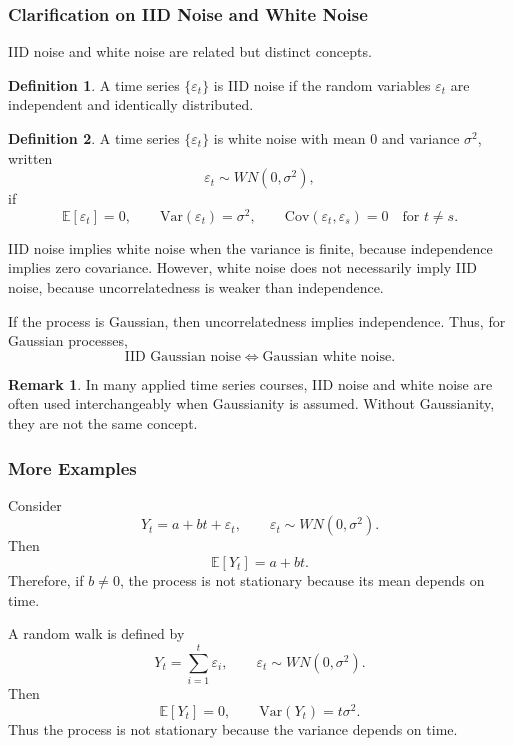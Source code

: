 \documentclass[12pt,oneside]{book}
\numberwithin{equation}{section}
\theoremstyle{definition}
\newtheorem{definition}{Definition}[section]
\newtheorem{remark}{Remark}[section]
\theoremstyle{plain}
\theoremstyle{remark}
\newcommand{\E}{\mathbb{E}}
\newcommand{\Var}{\mathrm{Var}}
\newcommand{\Cov}{\mathrm{Cov}}
\begin{document}
\subsubsection*{Clarification on IID Noise and White Noise}

IID noise and white noise are related but distinct concepts.

\begin{definition}
A time series $\{\varepsilon_t\}$ is IID noise if the random variables $\varepsilon_t$ are independent and identically distributed.
\end{definition}

\begin{definition}
A time series $\{\varepsilon_t\}$ is white noise with mean $0$ and variance $\sigma^2$, written
\[
\varepsilon_t \sim WN(0,\sigma^2),
\]
if
\[
\E[\varepsilon_t]=0,
\qquad
\Var(\varepsilon_t)=\sigma^2,
\qquad
\Cov(\varepsilon_t,\varepsilon_s)=0
\quad
\text{for } t\neq s.
\]
\end{definition}

IID noise implies white noise when the variance is finite, because independence implies zero covariance. However, white noise does not necessarily imply IID noise, because uncorrelatedness is weaker than independence.

If the process is Gaussian, then uncorrelatedness implies independence. Thus, for Gaussian processes,
\[
\text{IID Gaussian noise}
\iff
\text{Gaussian white noise}.
\]

\begin{remark}
In many applied time series courses, IID noise and white noise are often used interchangeably when Gaussianity is assumed. Without Gaussianity, they are not the same concept.
\end{remark}

\subsubsection*{More Examples}

Consider
\[
Y_t=a+bt+\varepsilon_t,
\qquad
\varepsilon_t\sim WN(0,\sigma^2).
\]
Then
\[
\E[Y_t]=a+bt.
\]
Therefore, if $b\neq 0$, the process is not stationary because its mean depends on time.

A random walk is defined by
\[
Y_t=\sum_{i=1}^t \varepsilon_i,
\qquad
\varepsilon_t\sim WN(0,\sigma^2).
\]
Then
\[
\E[Y_t]=0,
\qquad
\Var(Y_t)=t\sigma^2.
\]
Thus the process is not stationary because the variance depends on time.
\end{document}
